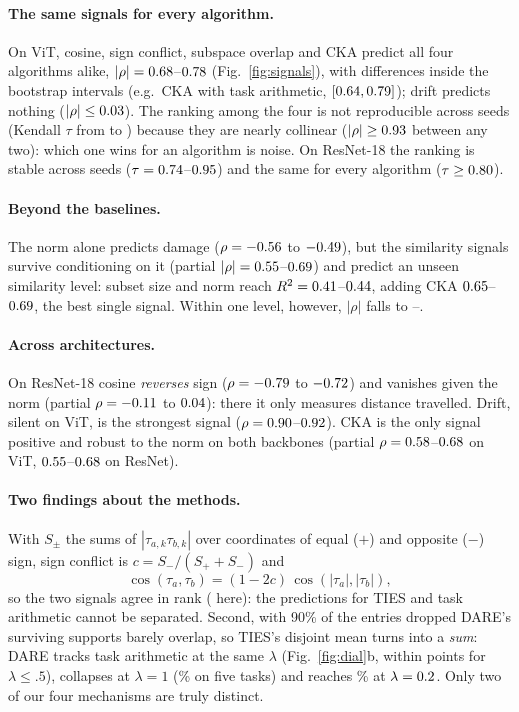 \documentclass{article}
\begin{document}
\paragraph{The same signals for every algorithm.} On ViT, cosine, sign conflict, subspace overlap and CKA predict all four algorithms alike, $|\rho| = 0.68$--$0.78$ (Fig.~\ref{fig:signals}), with differences inside the bootstrap intervals (e.g.\ CKA with task arithmetic, $[0.64, 0.79]$); drift predicts nothing ($|\rho| \le 0.03$). The ranking among the four is not reproducible across seeds (Kendall $\tau$ from \kendallSeedVitMin{} to \kendallSeedVitMax) because they are nearly collinear ($|\rho| \ge 0.93$ between any two): which one wins for an algorithm is noise. On ResNet-18 the ranking is stable across seeds ($\tau = 0.74$--$0.95$) and the same for every algorithm ($\tau \ge 0.80$).

\paragraph{Beyond the baselines.} The norm alone predicts damage ($\rho = -0.56$ to $-0.49$), but the similarity signals survive conditioning on it (partial $|\rho| = 0.55$--$0.69$) and predict an unseen similarity level: subset size and norm reach $R^2 = 0.41$--$0.44$, adding CKA $0.65$--$0.69$, the best single signal. Within one level, however, $|\rho|$ falls to \rhoVitWithinMin--\rhoVitWithinMax.

\paragraph{Across architectures.} On ResNet-18 cosine \emph{reverses} sign ($\rho = -0.79$ to $-0.72$) and vanishes given the norm (partial $\rho = -0.11$ to $0.04$): there it only measures distance travelled. Drift, silent on ViT, is the strongest signal ($\rho = 0.90$--$0.92$). CKA is the only signal positive and robust to the norm on both backbones (partial $\rho = 0.58$--$0.68$ on ViT, $0.55$--$0.68$ on ResNet).

\paragraph{Two findings about the methods.} With $S_\pm$ the sums of $|\tau_{a,k}\tau_{b,k}|$ over coordinates of equal ($+$) and opposite ($-$) sign, sign conflict is $c = S_-/(S_+ + S_-)$ and
\[
\cos(\tau_a, \tau_b) = (1 - 2c)\,\cos(|\tau_a|, |\tau_b|),
\]
so the two signals agree in rank (\corrCosSignVit{} here): the predictions for TIES and task arithmetic cannot be separated. Second, with 90\% of the entries dropped DARE's surviving supports barely overlap, so TIES's disjoint mean turns into a \emph{sum}: DARE tracks task arithmetic at the same $\lambda$ (Fig.~\ref{fig:dial}b, within \dareTaGapMax{} points for $\lambda \le .5$), collapses at $\lambda = 1$ (\dareOneFive\% on five tasks) and reaches \dareBestFive\% at $\lambda = 0.2$. Only two of our four mechanisms are truly distinct.
\end{document}
